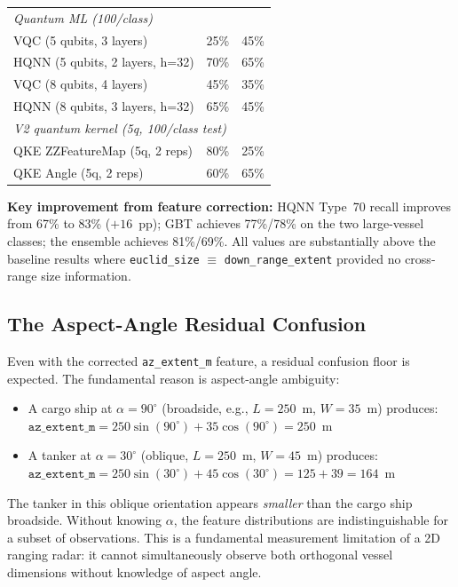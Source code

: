 \documentclass[journal]{IEEEtran}
\begin{document}
\begin{table}[H]
\begin{tabular}{p{7.5cm}rr}
\multicolumn{3}{l}{\quad\textit{Quantum ML (100/class)}} \\
VQC  (5 qubits, 3 layers)         & 25\% & 45\% \\
HQNN (5 qubits, 2 layers, h=32)   & 70\% & 65\% \\
VQC  (8 qubits, 4 layers)         & 45\% & 35\% \\
HQNN (8 qubits, 3 layers, h=32)   & 65\% & 45\% \\
\midrule
\multicolumn{3}{l}{\textit{V2 quantum kernel (5q, 100/class test)}} \\
QKE ZZFeatureMap (5q, 2 reps)     & 80\% & 25\% \\
QKE Angle (5q, 2 reps)            & 60\% & 65\% \\
\bottomrule
\end{tabular}
\end{table}

\noindent\textbf{Key improvement from feature correction:}
HQNN Type~70 recall improves from 67\% to 83\% ($+16$~pp);
GBT achieves 77\%/78\% on the two large-vessel classes;
the ensemble achieves 81\%/69\%.
All values are substantially above the baseline results where
\texttt{euclid\_size} $\equiv$ \texttt{down\_range\_extent} provided
no cross-range size information.

\subsection{The Aspect-Angle Residual Confusion}
\label{sec:aspect_residual}

Even with the corrected \texttt{az\_extent\_m} feature, a residual confusion
floor is expected. The fundamental reason is aspect-angle ambiguity:

\begin{itemize}
  \item A cargo ship at $\alpha = 90^\circ$ (broadside, e.g., $L=250$~m,
        $W=35$~m) produces:
        $\texttt{az\_extent\_m} = 250\sin(90^\circ) + 35\cos(90^\circ) = 250$~m
  \item A tanker at $\alpha = 30^\circ$ (oblique, $L=250$~m, $W=45$~m) produces:
        $\texttt{az\_extent\_m} = 250\sin(30^\circ) + 45\cos(30^\circ) = 125 + 39 = 164$~m
\end{itemize}

The tanker in this oblique orientation appears \emph{smaller} than the cargo ship
broadside. Without knowing $\alpha$, the feature distributions are
indistinguishable for a subset of observations. This is a fundamental measurement
limitation of a 2D ranging radar: it cannot simultaneously observe both
orthogonal vessel dimensions without knowledge of aspect angle.
\end{document}
